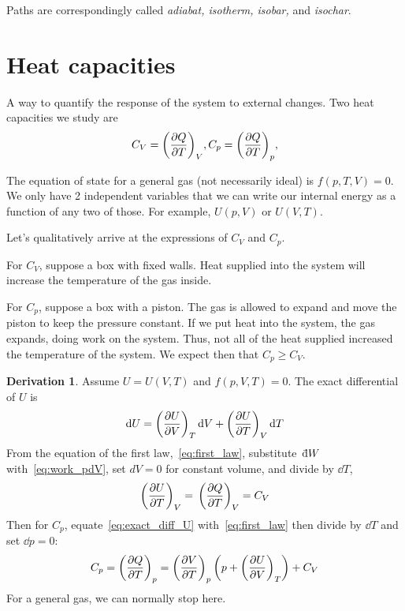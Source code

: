 \documentclass[12pt,chapterprefix=false,dvipsnames]{scrbook}
\theoremstyle{dotless}
\theoremstyle{definition}
\newtheorem{protoderivation}{Derivation}[section]
\newenvironment{derivation}
{\colorlet{shadecolor}{purple!15}\begin{shaded}\begin{protoderivation}}
			{\end{protoderivation}\end{shaded}}
\def\dbar{{\mathchar'26\mkern-10mu \mathrm{d}}}
\begin{document}
Paths are correspondingly called \textit{adiabat, isotherm, isobar,} and
\textit{isochar}.

\section{Heat capacities}%
\label{sec:heat_capacities}

A way to quantify the response of the system to external
changes. Two heat capacities we study are
\[
	C_{V} = {\left(\pdv{Q}{T}\right)}_V,
	C_{p} = {\left(\pdv{Q}{T}\right)}_p,
\]

The equation of state for a general gas (not necessarily ideal)
is $f(p,T,V) = 0$. We only have 2 independent variables
that we can write our internal energy as a function of any two
of those. For example, $U(p,V)$ or
$U(V,T)$.

Let's qualitatively arrive at the expressions of
$C_{V}$ and $C_{p}$.

For $C_{V}$, suppose a box with fixed walls.
Heat supplied into the system will increase the temperature of
the gas inside.

For $C_{p}$, suppose a box with a piston. The
gas is allowed to expand and move the piston to keep the
pressure constant. If we put heat into the system, the gas
expands, doing work on the system. Thus, not all of the heat
supplied increased the temperature of the system. We expect then
that $C_{p} \geq
	C_{V}$.

\begin{derivation}
	Assume $U = U(V,T)$ and $f(p,V,T) = 0$. The
	exact differential of $U$ is
	\begin{equation}
		\label{eq:exact_diff_U}
		\dd{U}
		=
		{\left(\pdv{U}{V}\right)}_T\dd{V} +
		{\left(\pdv{U}{T}\right)}_V\dd{T}
	\end{equation}
	From the equation of the first law,~\ref{eq:first_law},
	substitute\, $\dbar W$
	with~\ref{eq:work_pdV}, set $dV = 0$ for
	constant volume, and divide by $\dd{T}$,
	\begin{equation}
		{\left(\pdv{U}{T}\right)}_V
		=\,
		{\left(\pdv{Q}{T}\right)}_V
		=
		C_{V}
	\end{equation}
	Then for $C_{p}$, equate~\ref{eq:exact_diff_U}
	with~\ref{eq:first_law} then divide by
	$\dd{T}$ and set $\dd{p} = 0$:
	\begin{equation}
		\label{eq:cp_in_terms_of_cv}
		C_{p} =
			{\left(\pdv{Q}{T}\right)}_{p} = {\left(\pdv{V}{T}\right)}_{p}\left(p+{\left(\pdv{U}{V}\right)}_T\right) +
		C_{V}
	\end{equation}
	For a general gas, we can normally stop here.
\end{derivation}
\end{document}
